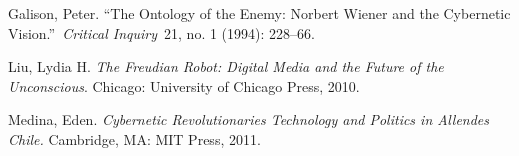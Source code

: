 \documentclass{tufte-handout}
\begin{document}
\begin{hangparas}{.25in}{1} 



Galison, Peter. ``The Ontology of the Enemy: Norbert Wiener and the
Cybernetic Vision.''~\emph{Critical Inquiry}~21, no. 1 (1994): 228--66.

Liu, Lydia H. \emph{The Freudian Robot: Digital Media and the Future of
the Unconscious}. Chicago: University of Chicago Press, 2010.

Medina, Eden. \emph{Cybernetic Revolutionaries Technology and Politics
in Allende\textquotesingle s Chile.} Cambridge, MA: MIT Press, 2011.



\end{hangparas}
\end{document}
